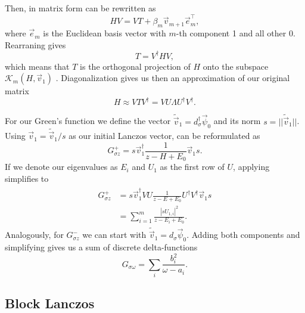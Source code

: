 Then,  in matrix form can be rewritten as
\begin{equation}
    H V = V T + \beta_{m}\vec{v}_{m+1}\vec{e}_{m}^\intercal,
\end{equation}
where $\vec{e}_m$ is the Euclidean basis vector with $m$-th component 1 and all other 0.
Rearraning gives
\begin{equation}
    T = V^\dag H V,
\end{equation}
which means that $T$ is the orthogonal projection of $H$ onto
the subspace $\mathcal{K}_m(H, \vec{v}_1)$ \cite{Cullum1985}.
Diagonalization gives us then an approximation of our original matrix
\begin{equation}
    H \approx V T V^\dag = V U \Lambda U^\dag V^\dag.
    \label{eq:Lanczos-matrix-approximation}
\end{equation}

For our Green's function we define the vector $\tilde{\vec{v}}_1 = d_\sigma^\dag \vec{\psi}_0$
and its norm $s = ||\tilde{\vec{v}}_1||$.
Using $\vec{v}_1 = \tilde{\vec{v}}_1/s$ as our initial Lanczos vector,
 can be reformulated as
\begin{equation}
    G^+_{\sigma z} = s \vec{v}_1^\dag \frac{1}{z - H + E_0} \vec{v}_1 s.
\end{equation}
If we denote our eigenvalues as $E_i$ and $U_1$ as the first row of $U$,
applying  simplifies to
\begin{align}
    \begin{split}
        G^+_{\sigma z}
         & =
        s \vec{v}_1^\dag V U \frac{1}{z - E + E_0} U^\dag V^\dag \vec{v}_1 s \\
         & =
        \sum_{i=1}^m \frac{|s U_{1,i}|^2}{z - E_i + E_0}.
    \end{split}
\end{align}
Analogously, for $G^-_{\sigma z}$ we can start with $\tilde{\vec{v}}_1 = d_\sigma \vec{\psi}_0$.
Adding both components and simplifying gives us a sum of discrete delta-functions \cite{Lu2014}
\begin{equation}
    G_{\sigma\omega} = \sum_i \frac{b_i^2}{\omega - a_i}.
\end{equation}

\subsection{Block Lanczos}

